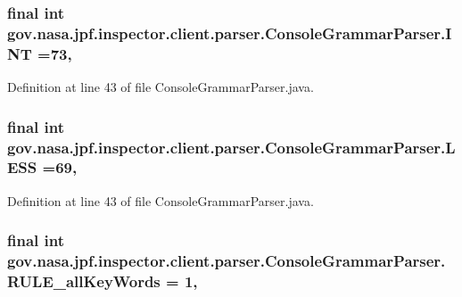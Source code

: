 \subsubsection[{\texorpdfstring{I\+NT}{INT}}]{\setlength{\rightskip}{0pt plus 5cm}final int gov.\+nasa.\+jpf.\+inspector.\+client.\+parser.\+Console\+Grammar\+Parser.\+I\+NT =73\hspace{0.3cm}{\ttfamily [static]}, {\ttfamily [package]}}\hypertarget{classgov_1_1nasa_1_1jpf_1_1inspector_1_1client_1_1parser_1_1_console_grammar_parser_abd77a1befc3eca91ef4ffb5856126df5}{}\label{classgov_1_1nasa_1_1jpf_1_1inspector_1_1client_1_1parser_1_1_console_grammar_parser_abd77a1befc3eca91ef4ffb5856126df5}


Definition at line 43 of file Console\+Grammar\+Parser.\+java.

\subsubsection[{\texorpdfstring{L\+E\+SS}{LESS}}]{\setlength{\rightskip}{0pt plus 5cm}final int gov.\+nasa.\+jpf.\+inspector.\+client.\+parser.\+Console\+Grammar\+Parser.\+L\+E\+SS =69\hspace{0.3cm}{\ttfamily [static]}, {\ttfamily [package]}}\hypertarget{classgov_1_1nasa_1_1jpf_1_1inspector_1_1client_1_1parser_1_1_console_grammar_parser_ac325745c393b7e613626f2c93e95e486}{}\label{classgov_1_1nasa_1_1jpf_1_1inspector_1_1client_1_1parser_1_1_console_grammar_parser_ac325745c393b7e613626f2c93e95e486}


Definition at line 43 of file Console\+Grammar\+Parser.\+java.

\subsubsection[{\texorpdfstring{R\+U\+L\+E\+\_\+all\+Key\+Words}{RULE_allKeyWords}}]{\setlength{\rightskip}{0pt plus 5cm}final int gov.\+nasa.\+jpf.\+inspector.\+client.\+parser.\+Console\+Grammar\+Parser.\+R\+U\+L\+E\+\_\+all\+Key\+Words = 1\hspace{0.3cm}{\ttfamily [static]}, {\ttfamily [package]}}\hypertarget{classgov_1_1nasa_1_1jpf_1_1inspector_1_1client_1_1parser_1_1_console_grammar_parser_affcebe0bdc4fd98308343e628a3ee558}{}\label{classgov_1_1nasa_1_1jpf_1_1inspector_1_1client_1_1parser_1_1_console_grammar_parser_affcebe0bdc4fd98308343e628a3ee558}


